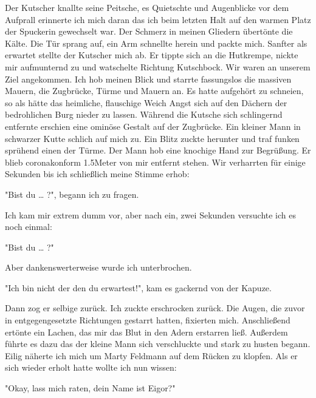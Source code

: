 \documentclass[ebook]{article}
\begin{document}
\noindent Der Kutscher knallte seine Peitsche, es Quietschte und
Augenblicke vor dem Aufprall erinnerte ich mich daran das ich beim
letzten Halt auf den warmen Platz der Spuckerin gewechselt war. Der
Schmerz in meinen Gliedern übertönte die Kälte. Die Tür sprang auf,
ein Arm schnellte herein und packte mich. Sanfter als erwartet
stellte der Kutscher mich ab. Er tippte sich an die Hutkrempe,
nickte mir aufmunternd zu und watschelte Richtung Kutschbock. Wir
waren an unserem Ziel angekommen. Ich hob meinen Blick und starrte
fassungslos die massiven Mauern, die Zugbrücke, Türme und Mauern
an. Es hatte aufgehört zu schneien, so als hätte das heimliche,
flauschige Weich Angst sich auf den Dächern der bedrohlichen Burg
nieder zu lassen. Während die Kutsche sich schlingernd entfernte
erschien eine ominöse Gestalt auf der Zugbrücke. Ein kleiner Mann in
schwarzer Kutte schlich auf mich zu. Ein Blitz zuckte herunter und
traf funken sprühend einen der Türme. Der Mann hob eine knochige
Hand zur Begrüßung. Er blieb coronakonform 1.5Meter von mir
entfernt stehen. Wir verharrten für einige Sekunden bis ich
schließlich meine Stimme erhob:

\begin{center}
"Bist du \ldots{} ?", begann ich zu fragen.
\end{center}

\noindent Ich kam mir extrem dumm vor, aber nach ein, zwei Sekunden
versuchte ich es noch einmal:

\begin{center}
"Bist du \ldots{} ?"
\end{center}

\noindent Aber dankenswerterweise wurde ich unterbrochen.

\begin{center}
"Ich bin nicht der den du erwartest!", kam es gackernd von der
Kapuze.
\end{center}

\noindent Dann zog er selbige zurück. Ich zuckte erschrocken
zurück. Die Augen, die zuvor in entgegengesetzte Richtungen gestarrt
hatten, fixierten mich. Anschließend ertönte ein Lachen, das mir das
Blut in den Adern erstarren ließ. Außerdem führte es dazu das der
kleine Mann sich verschluckte und stark zu husten begann. Eilig
näherte ich mich um Marty Feldmann auf dem Rücken zu klopfen. Als er
sich wieder erholt hatte wollte ich nun wissen:

\begin{center}
"Okay, lass mich raten, dein Name ist Eigor?"
\end{center}
\end{document}
